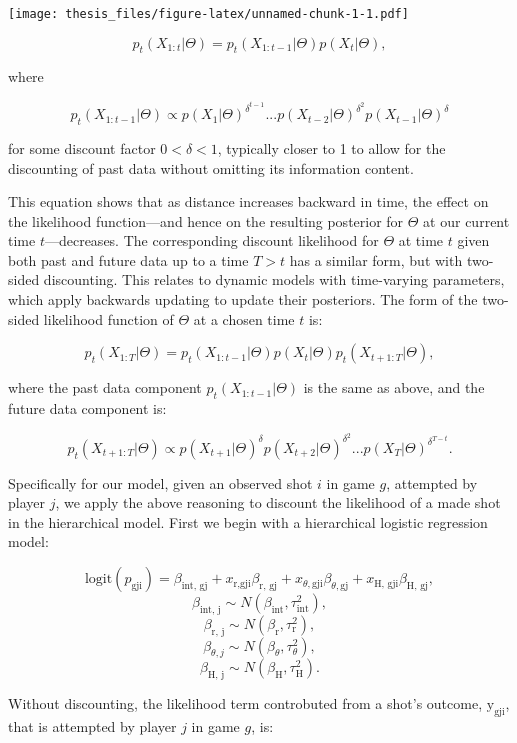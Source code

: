 \documentclass[12pt,twoside]{dukestatscithesis}
\theoremstyle{definition}
\theoremstyle{definition}
\theoremstyle{definition}
\theoremstyle{remark}
\begin{document}
\texttt{[image: thesis\_files/figure-latex/unnamed-chunk-1-1.pdf]}

\pagebreak

\[
p_t(X_{1:t}|\Theta) = p_t(X_{1:t-1}|\Theta)p(X_t|\Theta),
\]

where

\[
p_t(X_{1:t-1}|\Theta) \propto
p(X_{1}  |\Theta)^{\delta^{t-1}}...
p(X_{t-2}|\Theta)^{\delta^{2}}
p(X_{t-1}|\Theta)^{\delta}
\]

for some discount factor \(0 < \delta < 1\), typically closer to 1 to
allow for the discounting of past data without omitting its information
content.

This equation shows that as distance increases backward in time, the
effect on the likelihood function---and hence on the resulting posterior
for \(\Theta\) at our current time \(t\)---decreases. The corresponding
discount likelihood for \(\Theta\) at time \(t\) given both past and
future data up to a time \(T > t\) has a similar form, but with
two-sided discounting. This relates to dynamic models with time-varying
parameters, which apply backwards updating to update their posteriors.
The form of the two-sided likelihood function of \(\Theta\) at a chosen
time \(t\) is:

\[
p_t(X_{1:T}|\Theta) = 
p_t(X_{1:t-1}|\Theta)
p(X_{t}|\Theta)
p_t(X_{t+1:T}|\Theta),
\]

where the past data component \(p_t(X_{1:t-1}|\Theta)\) is the same as
above, and the future data component is:

\[
p_t(X_{t+1:T}|\Theta) \propto
p(X_{t+1}|\Theta)^{\delta}
p(X_{t+2}|\Theta)^{\delta^2}...
p(X_{T}|\Theta)^{\delta^{T-t}}.
\]

Specifically for our model, given an observed shot \(\textit{i}\) in
game \(g\), attempted by player \(\textit{j}\), we apply the above
reasoning to discount the likelihood of a made shot in the hierarchical
model. First we begin with a hierarchical logistic regression model:

\[
\text{logit}(p_{\text{gji}}) = 
\beta_{\text{int, gj}} +
x_{\text{r,gji}}\beta_{\text{r, gj}} +
x_{\theta,\text{gji}}\beta_{\theta, \text{gj}} +
x_{\text{H, gji}}\beta_{\text{H, gj}},
\] \[
\beta_{\text{int, j}} \sim N(\beta_{\text{int}}, \tau^2_{\text{int}}),
\] \[
\beta_{\text{r, j}} \sim N(\beta_{\text{r}}, \tau^2_{\text{r}}),
\] \[
\beta_{\theta, j} \sim N(\beta_{\theta}, \tau^2_{\theta}),
\] \[
\beta_{\text{H, j}} \sim N(\beta_{\text{H}}, \tau^2_{\text{H}}).
\]

Without discounting, the likelihood term controbuted from a shot's
outcome, \(\text{y}_\text{gji}\), that is attempted by player
\(\textit{j}\) in game \(\textit{g}\), is:
\end{document}

